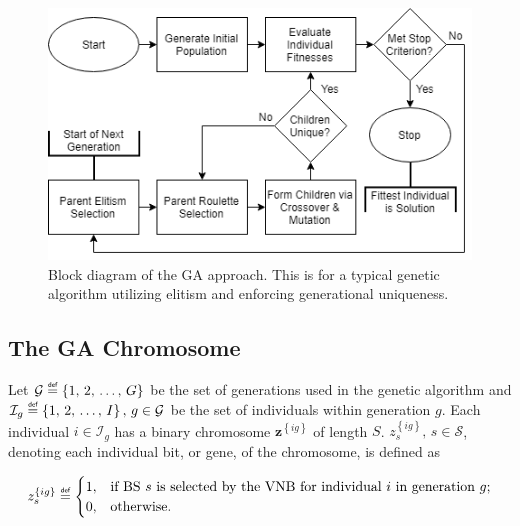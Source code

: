 \documentclass[12pt,dvipsnames]{report}
\newif\ifisdoublespacing
\newcommand\defeq{\mathrel{\overset{\makebox[0pt]{\mbox{\normalfont\tiny\sffamily def}}}{=}}}
\begin{document}
\begin{figure}[ht]
\centering
\includegraphics[width=1\linewidth]{Genetic_Algorithm_Basic}
\caption[Genetic Algorithm Block Diagram]{\small Block diagram of the GA approach.  This is for a typical genetic algorithm utilizing elitism and enforcing generational uniqueness.}
\label{fig:ga_block}
\end{figure}

\subsection{The GA Chromosome} \label{subsec:ga_chromosome}

Let $\mathcal{G} \defeq \left\{ 1,\, 2,\, \ldots,\, G \right\}$ be the set of generations used in the genetic algorithm and $\mathcal{I}_g \defeq \left\{ 1,\, 2,\, \ldots,\, I \right\},\, g \in \mathcal{G}$ be the set of individuals within generation $g$.  Each individual $i \in \mathcal{I}_g$ has a binary chromosome $\textbf{z}^{\left\{ ig \right\}}$ of length $S$.  $z_s^{\left\{ ig \right\}},\, s \in \mathcal{S}$, denoting each individual bit, or gene, of the chromosome, is defined as

\ifisdoublespacing
\begin{singlespacing}
\begin{equation}
z_s^{\left\{ ig \right\}} \defeq
	\begin{cases}
		1,& \text{if BS $s$ is selected by the VNB for individual $i$ in generation $g$;}\\
		\\
		0,& \text{otherwise.}
	\end{cases}
\end{equation}
\end{singlespacing}
\else
\begin{equation}
z_s^{\left\{ ig \right\}} \defeq
	\begin{cases}
		1,& \text{if BS $s$ is selected by the VNB for individual $i$ in generation $g$;}\\
		0,& \text{otherwise.}
	\end{cases}
\end{equation}
\fi
\end{document}
